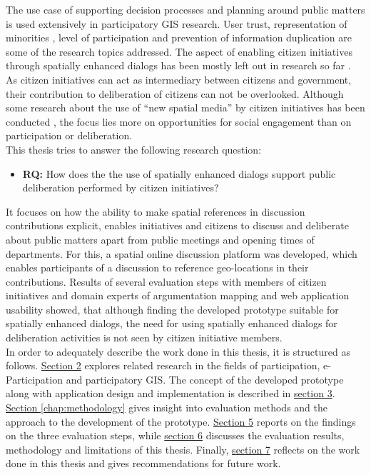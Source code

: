 The use case of supporting decision processes and planning around public matters is used extensively in participatory GIS research. User trust, representation of minorities \cite{Carver2001_PPGIS_Cyberdemocracy}, level of participation \cite{Steinmann2005_Combination_Ladder_GIS} and prevention of information duplication \cite{Hopfer2007_Communication} are some of the research topics addressed. The aspect of enabling citizen initiatives through spatially enhanced dialogs has been mostly left out in research so far \cite{Cai2009_spatial_annotation_deliberation}. As citizen initiatives can act as intermediary between citizens and government, their contribution to deliberation of citizens can not be overlooked. Although some research about the use of ``new spatial media'' by citizen initiatives has been conducted \cite{Elwood2013_NewSpatialMedia}, the focus lies more on opportunities for social engagement than on participation or deliberation.\\
This thesis tries to answer the following research question:
\begin{itemize}
  \item[] \textbf{RQ:} How does the the use of spatially enhanced dialogs support public deliberation performed by citizen initiatives?
\end{itemize}
It focuses on how the ability to make spatial references in discussion contributions explicit, enables initiatives and citizens to discuss and deliberate about public matters apart from public meetings and opening times of departments. For this, a spatial online discussion platform was developed, which enables participants of a discussion to reference geo-locations in their contributions. Results of several evaluation steps with members of citizen initiatives and domain experts of argumentation mapping and web application usability showed, that although finding the developed prototype suitable for spatially enhanced dialogs, the need for using spatially enhanced dialogs for deliberation activities is not seen by citizen initiative members.\\
In order to adequately describe the work done in this thesis, it is structured as follows. \hyperref[chap:related_work]{Section 2} explores related research in the fields of participation, e-Participation and participatory GIS. The concept of the developed prototype along with application design and implementation is described in \hyperref[chap:approach]{section 3}. \hyperref[chap:methodology]{Section \ref{chap:methodology}} gives insight into evaluation methods and the approach to the development of the prototype. \hyperref[chap:methodology]{Section 5} reports on the findings on the three evaluation steps, while \hyperref[chap:discussion]{section 6} discusses the evaluation results, methodology and limitations of this thesis. Finally, \hyperref[chap:conclusion]{section 7} reflects on the work done in this thesis and gives recommendations for future work.

